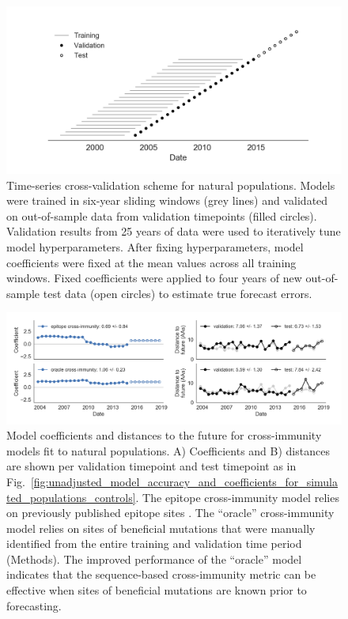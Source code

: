 \begin{figure}[H]
  \begin{center}
  \includegraphics[width=\textwidth]{figures/cross-validation-for-natural-populations.png}
  \caption{
  Time-series cross-validation scheme for natural populations.
  Models were trained in six-year sliding windows (grey lines) and validated on out-of-sample data from validation timepoints (filled circles).
  Validation results from 25 years of data were used to iteratively tune model hyperparameters.
  After fixing hyperparameters, model coefficients were fixed at the mean values across all training windows.
  Fixed coefficients were applied to four years of new out-of-sample test data (open circles) to estimate true forecast errors.
  }
  \label{sup_fig:cross_validation_for_natural_populations}
  \end{center}
\end{figure}

\begin{figure}[H]
  \begin{center}
  \includegraphics[width=\textwidth]{figures/unadjusted-composite-model-accuracy-and-coefficients-for-natural-populations-epitope-vs-oracle.png}
  \caption{
  Model coefficients and distances to the future for cross-immunity models fit to natural populations.
  A) Coefficients and B) distances are shown per validation timepoint and test timepoint as in Fig.~\ref{fig:unadjusted_model_accuracy_and_coefficients_for_simulated_populations_controls}.
  The epitope cross-immunity model relies on previously published epitope sites \cite{Luksza:2014hj}.
  The ``oracle'' cross-immunity model relies on sites of beneficial mutations that were manually identified from the entire training and validation time period (Methods).
  The improved performance of the ``oracle'' model indicates that the sequence-based cross-immunity metric can be effective when sites of beneficial mutations are known prior to forecasting.
  }
  \label{sup_fig:unadjusted_composite_model_accuracy_and_coefficients_for_natural_populations_epitope_vs_oracle}
  \end{center}
\end{figure}

